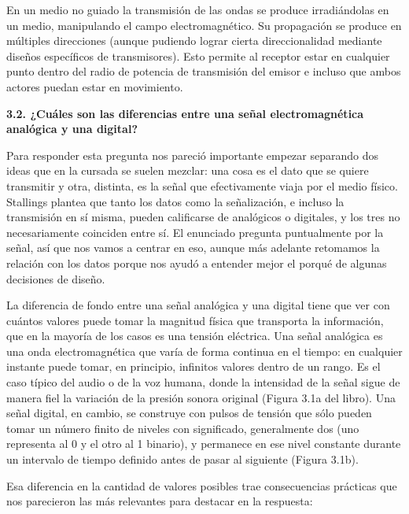 \documentclass[11pt,a4paper]{article}
\begin{document}
En un medio no guiado la transmisión de las ondas se produce irradiándolas en un medio, manipulando el campo electromagnético. Su propagación se produce en múltiples direcciones (aunque pudiendo lograr cierta direccionalidad mediante diseños específicos de transmisores). Esto permite al receptor estar en cualquier punto dentro del radio de potencia de transmisión del emisor e incluso que ambos actores puedan estar en movimiento.

\vspace{0.3cm}
\noindent\textbf{3.2. ¿Cuáles son las diferencias entre una señal electromagnética analógica y una digital?}\par

Para responder esta pregunta nos pareció importante empezar separando dos ideas que en la cursada se suelen mezclar: una cosa es el dato que se quiere transmitir y otra, distinta, es la señal que efectivamente viaja por el medio físico. Stallings plantea que tanto los datos como la señalización, e incluso la transmisión en sí misma, pueden calificarse de analógicos o digitales, y los tres no necesariamente coinciden entre sí. El enunciado pregunta puntualmente por la señal, así que nos vamos a centrar en eso, aunque más adelante retomamos la relación con los datos porque nos ayudó a entender mejor el porqué de algunas decisiones de diseño.

La diferencia de fondo entre una señal analógica y una digital tiene que ver con cuántos valores puede tomar la magnitud física que transporta la información, que en la mayoría de los casos es una tensión eléctrica. Una señal analógica es una onda electromagnética que varía de forma continua en el tiempo: en cualquier instante puede tomar, en principio, infinitos valores dentro de un rango. Es el caso típico del audio o de la voz humana, donde la intensidad de la señal sigue de manera fiel la variación de la presión sonora original (Figura 3.1a del libro). Una señal digital, en cambio, se construye con pulsos de tensión que sólo pueden tomar un número finito de niveles con significado, generalmente dos (uno representa al 0 y el otro al 1 binario), y permanece en ese nivel constante durante un intervalo de tiempo definido antes de pasar al siguiente (Figura 3.1b).

Esa diferencia en la cantidad de valores posibles trae consecuencias prácticas que nos parecieron las más relevantes para destacar en la respuesta:
\end{document}
